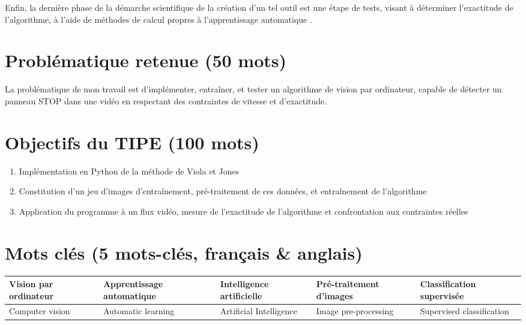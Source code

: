 \documentclass[12pt,a4paper]{article}
\begin{document}
Enfin, la dernière phase de la démarche scientifique de la création d’un tel outil est une étape de tests, visant à déterminer l’exactitude de l’algorithme, à l’aide de méthodes de calcul propres à l’apprentissage automatique \cite{powers}.



\section{Problématique retenue (50 mots)}
La problématique de mon travail est d’implémenter, entraîner, et tester un algorithme de vision par ordinateur, capable de détecter un panneau STOP dans une vidéo en respectant des contraintes de vitesse et d’exactitude.

\section{Objectifs du TIPE (100 mots)}
\begin{enumerate}
\item Implémentation en Python de la méthode de Viola et Jones
\item Constitution d’un jeu d’images d’entraînement, pré-traitement de ces données, et entraînement de l’algorithme
\item Application du programme à un flux vidéo, mesure de l’exactitude de l’algorithme et confrontation aux contraintes réelles
\end{enumerate}


\section{Mots clés (5 mots-clés, français \& anglais)}
\begin{tabular}{|>{\centering\arraybackslash}m{3cm}|>{\centering\arraybackslash}m{3cm}|>{\centering\arraybackslash}m{3cm}|>{\centering\arraybackslash}m{3cm}|>{\centering\arraybackslash}m{3cm}|}
\hline
Vision par ordinateur & Apprentissage automatique & Intelligence artificielle & Pré-traitement d’images &Classification supervisée \\
\hline
Computer vision & Automatic learning & Artificial Intelligence & Image pre-processing & Supervised classification \\
\hline
\end{tabular}
\end{document}
